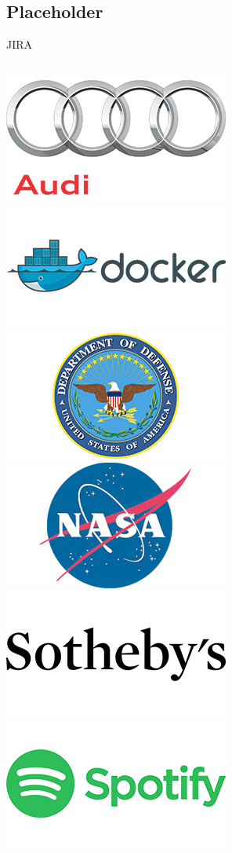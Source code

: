 \documentclass{beamer}
\begin{document}
\subsection{Placeholder}
\begin{frame}{JIRA}
	\begin{columns}[T]
		\begin{column}{.33\linewidth}
			\vfill
			\includegraphics[scale=.15]{jira-audi.png} \hfill \includegraphics[scale=.15]{jira-docker.png}
			\vfill
			\includegraphics[scale=.15]{jira-dod.png} \hfill \includegraphics[scale=.15]{jira-nasa.png}
			\vfill
			\includegraphics[scale=.15]{jira-sothebys.png} \hfill \includegraphics[scale=.15]{jira-spotify.png}

\end{column}
\end{columns}
\end{frame}
\end{document}
